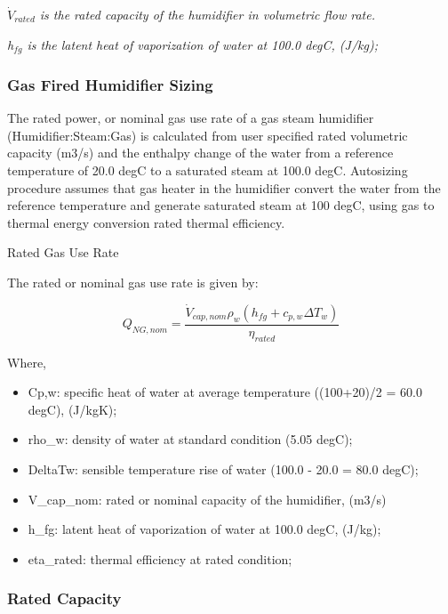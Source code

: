 \emph{\({\dot V_{rated}}\) is the rated capacity of the humidifier in volumetric flow rate.}

\emph{h\(_{fg}\) is the latent heat of vaporization of water at 100.0 degC, (J/kg);}

\subsubsection{Gas Fired Humidifier Sizing}\label{gas-fired-humidifier-sizing}

The rated power, or nominal gas use rate of a gas steam humidifier (Humidifier:Steam:Gas) is calculated from user specified rated volumetric capacity (m3/s) and the enthalpy change of the water from a reference temperature of 20.0 degC to a saturated steam at 100.0 degC. Autosizing procedure assumes that gas heater in the humidifier convert the water from the reference temperature and generate saturated steam at 100 degC, using gas to thermal energy conversion rated thermal efficiency.

Rated Gas Use Rate

The rated or nominal gas use rate is given by:

\begin{equation}
Q_{NG,nom} = \frac{\dot{V}_{cap,nom}\rho_w\left(h_{fg}+c_{p,w}\Delta T_w\right)}{\eta_{rated}}
\end{equation}

Where,

\begin{itemize}
\item
  Cp,w: specific heat of water at average temperature ((100+20)/2 = 60.0 degC), (J/kgK);
\item
  rho\_w: density of water at standard condition (5.05 degC);
\item
  DeltaTw: sensible temperature rise of water (100.0 - 20.0 = 80.0 degC);
\item
  V\_cap\_nom: rated or nominal capacity of the humidifier, (m3/s)
\item
  h\_fg: latent heat of vaporization of water at 100.0 degC, (J/kg);
\item
  eta\_rated: thermal efficiency at rated condition;
\end{itemize}

\subsubsection{Rated Capacity}\label{rated-capacity}

